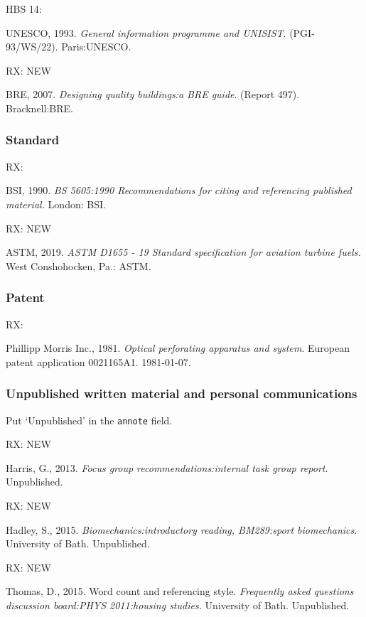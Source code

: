 HBS 14: \cite{unesco1993gip}

UNESCO, 1993. \emph{General information programme and UNISIST}\@. (PGI-93/WS/22). Paris:\@ UNESCO.


RX: \cite{bre2007dqb} NEW

BRE, 2007. \emph{Designing quality buildings:\@ a BRE guide}. (Report 497). Bracknell:\@ BRE.



\subsubsection*{Standard}

RX: \cite{bs5605:1990}

BSI, 1990. \emph{BS 5605:1990 Recommendations for citing and referencing
published material.} London: BSI.


RX: \cite{astm.d1655} NEW

ASTM, 2019. \emph{ASTM D1655 - 19 Standard specification for aviation
turbine fuels.} West Conshohocken, Pa.: ASTM.



\subsubsection*{Patent}

RX: \cite{pm1981opa}

Phillipp Morris Inc., 1981. \emph{Optical perforating apparatus and system}. European patent application 0021165A1. 1981-01-07.



\subsubsection*{Unpublished written material and personal communications}

Put `Unpublished' in the \texttt{annote} field.

RX: \cite{harris2013fgr} NEW

Harris, G., 2013. \emph{Focus group recommendations:\@ internal task group
report}. Unpublished.


RX: \cite{hadley2015bir} NEW

Hadley, S., 2015. \emph{Biomechanics:\@ introductory reading, BM289:\@ sport
biomechanics}. University of Bath. Unpublished.


RX: \cite{thomas2015wcr} NEW

Thomas, D., 2015. Word count and referencing style. \emph{Frequently
asked questions discussion board:\@ PHYS 2011:\@ housing studies.}
University of Bath. Unpublished.



